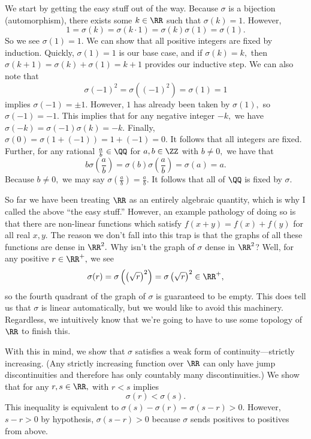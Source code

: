 We start by getting the easy stuff out of the way. Because $\sigma$ is a bijection (automorphism), there exists some $k\in\RR$ such that $\sigma(k)=1.$ However,
\[1=\sigma(k)=\sigma(k\cdot1)=\sigma(k)\sigma(1)=\sigma(1).\]
So we see $\sigma(1)=1.$ We can show that all positive integers are fixed by induction. Quickly, $\sigma(1)=1$ is our base case, and if $\sigma(k)=k,$ then $\sigma(k+1)=\sigma(k)+\sigma(1)=k+1$ provides our inductive step. We can also note that
\[\sigma(-1)^2=\sigma\left((-1)^2\right)=\sigma(1)=1\]
implies $\sigma(-1)=\pm1.$ However, $1$ has already been taken by $\sigma(1),$ so $\sigma(-1)=-1.$ This implies that for any negative integer $-k,$ we have $\sigma(-k)=\sigma(-1)\sigma(k)=-k.$ Finally, $\sigma(0)=\sigma(1+(-1))=1+(-1)=0.$ It follows that all integers are fixed. Further, for any rational $\frac ab\in\QQ$ for $a,b\in\ZZ$ with $b\ne0,$ we have that
\[b\sigma\left(\frac ab\right)=\sigma(b)\sigma\left(\frac ab\right)=\sigma(a)=a.\]
Because $b\ne0,$ we may say $\sigma\left(\frac ab\right)=\frac ab.$ It follows that all of $\QQ$ is fixed by $\sigma.$

So far we have been treating $\RR$ as an entirely algebraic quantity, which is why I called the above ``the easy stuff.'' However, an example pathology of doing so is that there are non-linear functions which satisfy $f(x+y)=f(x)+f(y)$ for all real $x,y.$ The reason we don't fall into this trap is that the graphs of all these functions are dense in $\RR^2.$ Why isn't the graph of $\sigma$ dense in $\RR^2$? Well, for any positive $r\in\RR^+,$ we see
\[\sigma(r)=\sigma\left(\left(\sqrt r\right)^2\right)=\sigma\left(\sqrt r\right)^2\in\RR^+,\]
so the fourth quadrant of the graph of $\sigma$ is guaranteed to be empty. This does tell us that $\sigma$ is linear automatically, but we would like to avoid this machinery. Regardless, we intuitively know that we're going to have to use some topology of $\RR$ to finish this.

With this in mind, we show that $\sigma$ satisfies a weak form of continuity---strictly increasing. (Any strictly increasing function over $\RR$ can only have jump discontinuities and therefore has only countably many discontinuities.) We show that for any $r,s\in\RR,$ with $r<s$ implies
\[\sigma(r)<\sigma(s).\]
This inequality is equivalent to $\sigma(s)-\sigma(r)=\sigma(s-r)>0.$ However, $s-r>0$ by hypothesis, $\sigma(s-r)>0$ because $\sigma$ sends positives to positives from above.

